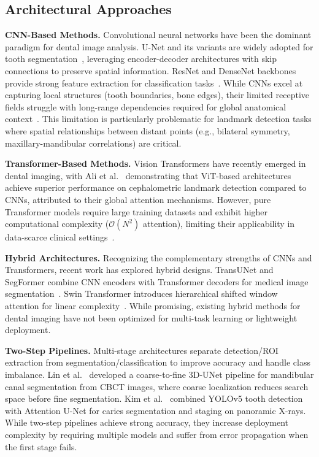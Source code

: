 \subsection{Architectural Approaches}
\label{subsec:architectures}

\textbf{CNN-Based Methods.} Convolutional neural networks have been the dominant paradigm for dental image analysis. U-Net and its variants are widely adopted for tooth segmentation~\cite{hassanein2024utilizing}, leveraging encoder-decoder architectures with skip connections to preserve spatial information. ResNet and DenseNet backbones provide strong feature extraction for classification tasks~\cite{george2025deep}. While CNNs excel at capturing local structures (tooth boundaries, bone edges), their limited receptive fields struggle with long-range dependencies required for global anatomical context~\cite{li2021deep}. This limitation is particularly problematic for landmark detection tasks where spatial relationships between distant points (e.g., bilateral symmetry, maxillary-mandibular correlations) are critical.

\textbf{Transformer-Based Methods.} Vision Transformers have recently emerged in dental imaging, with Ali et al.~\cite{ali2025interpretable} demonstrating that ViT-based architectures achieve superior performance on cephalometric landmark detection compared to CNNs, attributed to their global attention mechanisms. However, pure Transformer models require large training datasets and exhibit higher computational complexity ($\mathcal{O}(N^2)$ attention), limiting their applicability in data-scarce clinical settings~\cite{wu2025abductive}.

\textbf{Hybrid Architectures.} Recognizing the complementary strengths of CNNs and Transformers, recent work has explored hybrid designs. TransUNet and SegFormer combine CNN encoders with Transformer decoders for medical image segmentation~\cite{araujo2025twostep}. Swin Transformer introduces hierarchical shifted window attention for linear complexity~\cite{george2025deep}. While promising, existing hybrid methods for dental imaging have not been optimized for multi-task learning or lightweight deployment.

\textbf{Two-Step Pipelines.} Multi-stage architectures separate detection/ROI extraction from segmentation/classification to improve accuracy and handle class imbalance. Lin et al.~\cite{lin2023mandibular} developed a coarse-to-fine 3D-UNet pipeline for mandibular canal segmentation from CBCT images, where coarse localization reduces search space before fine segmentation. Kim et al.~\cite{kim2025multistage} combined YOLOv5 tooth detection with Attention U-Net for caries segmentation and staging on panoramic X-rays. While two-step pipelines achieve strong accuracy, they increase deployment complexity by requiring multiple models and suffer from error propagation when the first stage fails.

